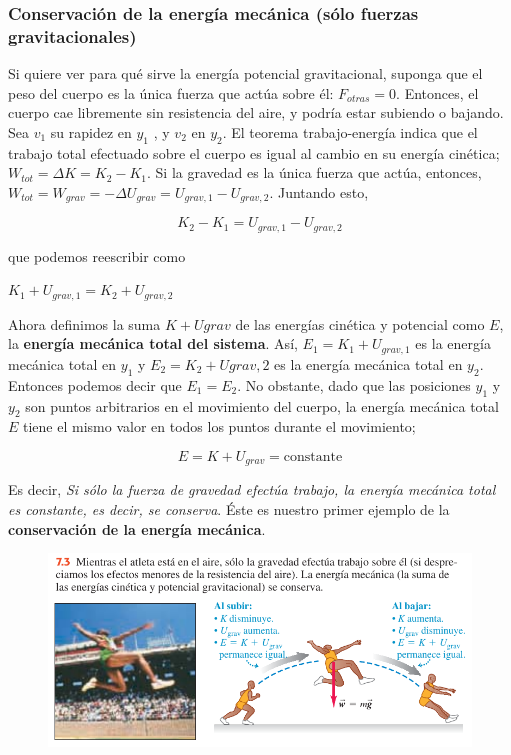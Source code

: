 \documentclass{article}
\newcommand{\newtitle}[1]{
    \color{titleColor}
    \subsubsection{#1}
    \color{black}
}
\newcommand{\bl}[1]{\textbf{#1}}
\newcommand{\definicion}[1]{%
    \vspace{0.5cm}
    \begin{definicionbox}
        #1
    \end{definicionbox}
    \vspace{0.5cm}
}
\begin{document}
    \newtitle{Conservación de la energía mecánica (sólo fuerzas gravitacionales)}

    \par Si quiere ver para qué sirve la energía potencial gravitacional, suponga que el peso del cuerpo es la única fuerza que actúa sobre él: $F_{otras} = 0$. Entonces, el cuerpo cae libremente sin resistencia del aire, y podría estar subiendo o bajando. Sea $v_1$ su rapidez en $y_1$ , y $v_2$ en $y_2$. El teorema trabajo-energía indica que el trabajo total efectuado sobre el cuerpo es igual al cambio en su energía cinética; $W_{tot} = \Delta K = K_2 - K_1$. Si la gravedad es la única fuerza que actúa, entonces, $W_{tot} = W_{grav} = -\Delta U_{grav} = U_{grav,1} - U_{grav,2}$. Juntando esto,

    \[ K_2 - K_1 = U_{grav,1} - U_{grav,2} \]

    \noindent que podemos reescribir como

    \definicion{
        \centering
        $ K_1 + U_{grav,1} = K_2 + U_{grav,2} $
    }

    \par Ahora deﬁnimos la suma $K + U{grav}$ de las energías cinética y potencial como $E$, la \bl{energía mecánica total del sistema}. Así, $E_1 = K_1 + U_{grav,1}$ es la energía mecánica total en $y_1$ y $E_2 = K_2 + Ugrav,2$ es la energía mecánica total en $y_2$. Entonces podemos decir que $E_1 = E_2$. No obstante, dado que las posiciones $y_1$ y $y_2$ son puntos arbitrarios en el movimiento del cuerpo, la energía mecánica total $E$ tiene el mismo valor en todos los puntos durante el movimiento;

    \[ E = K + U_{grav} = \text{constante} \]

    \par Es decir, \textit{Si sólo la fuerza de gravedad efectúa trabajo, la energía mecánica total es constante, es decir, se conserva}. Éste es nuestro primer ejemplo de la \bl{conservación de la energía mecánica}.

    \begin{figure}[H]
        \centering
        \includegraphics[scale=0.7]{img/6.1-2.png}
    \end{figure}
\end{document}
